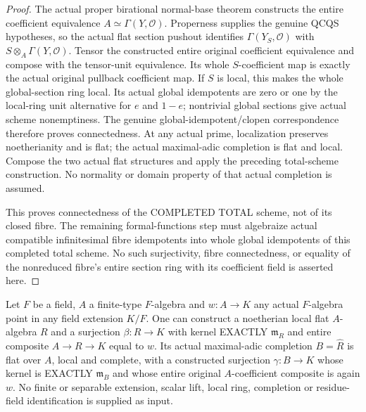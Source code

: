 \begin{proof}
The actual proper birational normal-base theorem constructs the entire coefficient equivalence
$A\simeq\Gamma(Y,\mathcal O)$. Properness supplies the genuine QCQS hypotheses, so the actual
flat section pushout identifies $\Gamma(Y_S,\mathcal O)$ with $S\otimes_A\Gamma(Y,\mathcal O)$.
Tensor the constructed entire original coefficient equivalence and compose with the tensor-unit
equivalence. Its whole $S$-coefficient map is exactly the actual original pullback coefficient map.
If $S$ is local, this makes the whole global-section ring local. Its actual global idempotents
are zero or one by the local-ring unit alternative for $e$ and $1-e$; nontrivial global sections
give actual scheme nonemptiness. The genuine global-idempotent/clopen correspondence therefore
proves connectedness. At any actual prime, localization preserves noetherianity and is flat;
the actual maximal-adic completion is flat and local. Compose the two actual flat structures
and apply the preceding total-scheme construction. No normality or domain property of that
actual completion is assumed.

This proves connectedness of the COMPLETED TOTAL scheme, not of its closed fibre. The remaining
formal-functions step must algebraize actual compatible infinitesimal fibre idempotents into
whole global idempotents of this completed total scheme. No such surjectivity, fibre connectedness,
or equality of the nonreduced fibre's entire section ring with its coefficient field is asserted here.
\end{proof}

\begin{lemma}\label{lem:fc-flat-local-field-lift}
\leanok
{}
Let $F$ be a field, $A$ a finite-type $F$-algebra and $w\colon A\to K$ any actual $F$-algebra point
in any field extension $K/F$. One can construct a noetherian local flat $A$-algebra $R$ and a surjection
$\beta\colon R\to K$ with kernel EXACTLY $\mathfrak m_R$ and entire composite $A\to R\to K$ equal to $w$.
Its actual maximal-adic completion $B=\widehat R$ is flat over $A$, local and complete, with a constructed
surjection $\gamma\colon B\to K$ whose kernel is EXACTLY $\mathfrak m_B$ and whose entire original
$A$-coefficient composite is again $w$. No finite or separable extension, scalar lift, local ring,
completion or residue-field identification is supplied as input.
\end{lemma}


